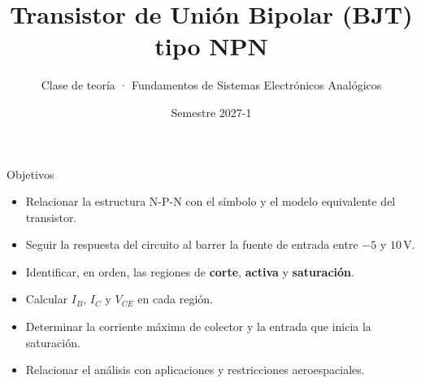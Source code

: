 \documentclass[aspectratio=169]{beamer}
\title[BJT NPN]{Transistor de Unión Bipolar (BJT) tipo NPN}
\subtitle{Clase de teoría · Fundamentos de Sistemas Electrónicos Analógicos}
\institute{Licenciatura en Ingeniería Aeroespacial · UNAM}
\date{Semestre 2027-1}
\begin{document}
\begin{frame}[plain]
  \titlepage
\end{frame}

\begin{frame}{Objetivos}
  \begin{itemize}
    \item Relacionar la estructura N-P-N con el símbolo y el modelo equivalente del transistor.
    \item Seguir la respuesta del circuito al barrer la fuente de entrada entre
      $-5$ y $10\,\mathrm{V}$.
    \item Identificar, en orden, las regiones de \textbf{corte}, \textbf{activa} y
      \textbf{saturación}.
    \item Calcular $I_B$, $I_C$ y $V_{CE}$ en cada región.
    \item Determinar la corriente máxima de colector y la entrada que inicia la saturación.
    \item Relacionar el análisis con aplicaciones y restricciones aeroespaciales.
  \end{itemize}
\end{frame}
\end{document}
